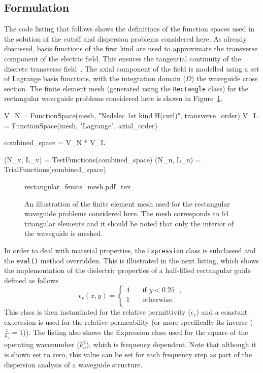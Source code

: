 \subsection{Formulation}
The code listing that follows shows the definitions of the function spaces used in the solution of the cutoff and dispersion problems considered here. As already discussed, \nedelec{} basis functions of the first kind are used to approximate the transverse component of the electric field. This ensures the tangential continuity of the discrete transverse field~\citep{Jin2002}.  The axial component of the field is modelled using a set of Lagrange basis functions, with the integration domain ($\Omega$) the waveguide cross section. The finite element mesh (generated using the \dolfin{} {\tt Rectangle} class) for the rectangular waveguide problems considered here is shown in Figure~\ref{fig:lezar:rectangular_fenics_mesh}.
\begin{python}
V_N = FunctionSpace(mesh, "Nedelec 1st kind H(curl)", transverse_order)
V_L = FunctionSpace(mesh, "Lagrange", axial_order)

combined_space = V_N * V_L

(N_v, L_v) = TestFunctions(combined_space)
(N_u, L_u) = TrialFunctions(combined_space)
\end{python}

\begin{figure}
  \centering
    \def\svgwidth{\smallfig}
  {rectangular_fenics_mesh.pdf_tex}
  \caption{An illustration of the finite element mesh used for the rectangular waveguide problems considered here. The mesh corresponds to 64 triangular elements and it should be noted that only the interior of the waveguide is meshed.}
  \label{fig:lezar:rectangular_fenics_mesh}
\end{figure}

In order to deal with material properties, the {\tt Expression} class is subclassed and the {\tt eval()} method overridden. This is illustrated in the next listing, which shows the implementation of the dielectric properties of a half-filled rectangular guide defined as follows
\begin{equation}
\label{eq:lezar:half_filled_dielectric}
\epsilon_r (x,y) = 
\begin{cases}
  4\quad &\text{if $y < 0.25$ },\\  
  1\quad &\text{otherwise}.\\
\end{cases} 
\end{equation}
This class is then instantiated for the relative permittivity ($\epsilon_r$) and a constant expression is used for the relative permeability (or more specifically its inverse ($\frac{1}{\mu_r} = 1$)). The listing also shows the Expression class used for the square of the operating wavenumber ($k_o^2$), which is frequency dependent. Note that although it is shown set to zero, this value can be set for each frequency step as part of the dispersion analysis of a waveguide structure.

